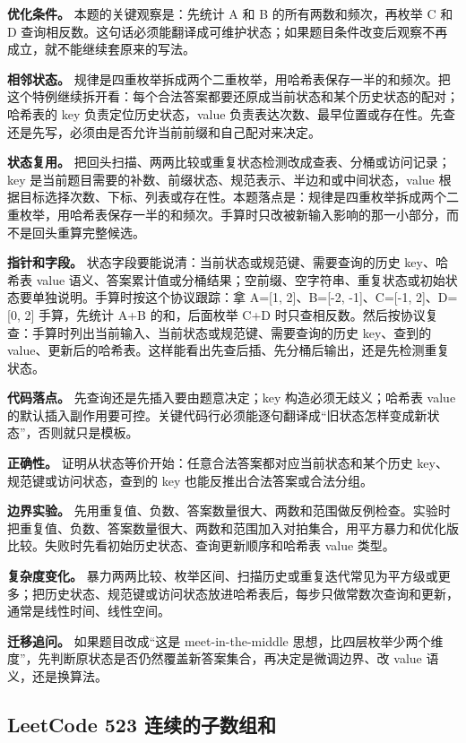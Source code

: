\textbf{优化条件。} 本题的关键观察是：先统计 A 和 B 的所有两数和频次，再枚举 C 和 D 查询相反数。这句话必须能翻译成可维护状态；如果题目条件改变后观察不再成立，就不能继续套原来的写法。

\textbf{相邻状态。} 规律是四重枚举拆成两个二重枚举，用哈希表保存一半的和频次。把这个特例继续拆开看：每个合法答案都要还原成当前状态和某个历史状态的配对；哈希表的 key 负责定位历史状态，value 负责表达次数、最早位置或存在性。先查还是先写，必须由是否允许当前前缀和自己配对来决定。

\textbf{状态复用。} 把回头扫描、两两比较或重复状态检测改成查表、分桶或访问记录；key 是当前题目需要的补数、前缀状态、规范表示、半边和或中间状态，value 根据目标选择次数、下标、列表或存在性。本题落点是：规律是四重枚举拆成两个二重枚举，用哈希表保存一半的和频次。手算时只改被新输入影响的那一小部分，而不是回头重算完整候选。

\textbf{指针和字段。} 状态字段要能说清：当前状态或规范键、需要查询的历史 key、哈希表 value 语义、答案累计值或分桶结果；空前缀、空字符串、重复状态或初始状态要单独说明。手算时按这个协议跟踪：拿 A=[1, 2]、B=[-2, -1]、C=[-1, 2]、D=[0, 2] 手算，先统计 A+B 的和，后面枚举 C+D 时只查相反数。然后按协议复查：手算时列出当前输入、当前状态或规范键、需要查询的历史 key、查到的 value、更新后的哈希表。这样能看出先查后插、先分桶后输出，还是先检测重复状态。

\textbf{代码落点。} 先查询还是先插入要由题意决定；key 构造必须无歧义；哈希表 value 的默认插入副作用要可控。关键代码行必须能逐句翻译成“旧状态怎样变成新状态”，否则就只是模板。

\textbf{正确性。} 证明从状态等价开始：任意合法答案都对应当前状态和某个历史 key、规范键或访问状态，查到的 key 也能反推出合法答案或合法分组。

\textbf{边界实验。} 先用重复值、负数、答案数量很大、两数和范围做反例检查。实验时把重复值、负数、答案数量很大、两数和范围加入对拍集合，用平方暴力和优化版比较。失败时先看初始历史状态、查询更新顺序和哈希表 value 类型。

\textbf{复杂度变化。} 暴力两两比较、枚举区间、扫描历史或重复迭代常见为平方级或更多；把历史状态、规范键或访问状态放进哈希表后，每步只做常数次查询和更新，通常是线性时间、线性空间。

\textbf{迁移追问。} 如果题目改成“这是 meet-in-the-middle 思想，比四层枚举少两个维度”，先判断原状态是否仍然覆盖新答案集合，再决定是微调边界、改 value 语义，还是换算法。

\subsection{LeetCode 523 连续的子数组和}

